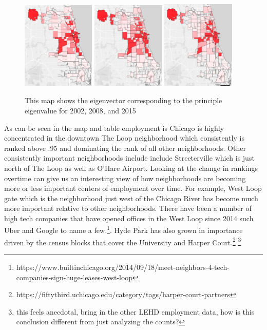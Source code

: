 \documentclass{article}
\theoremstyle{definition}
\theoremstyle{remark}
\begin{document}
\begin{figure}[H]
    \centering
    \includegraphics[width=0.31\textwidth]{Jobs-S000-2002}
    \includegraphics[width=0.31\textwidth]{Jobs-S000-2008}
    \includegraphics[width=0.31\textwidth]{Jobs-S000-2015}

        
    \caption{This map shows the eigenvector corresponding to the principle eigenvalue for 2002, 2008, and 2015}
    \label{fig:Jobs-S000-2008}
\end{figure}

As can be seen in the map and table employment is Chicago is highly concentrated in the downtown The Loop neighborhood which consistently is ranked above .95 and dominating the rank of all other neighborhoods.  Other consistently important neighborhoods include include Streeterville which is just north of The Loop as well as O'Hare Airport. Looking at the change in rankings overtime can give us an interesting view of how neighborhoods are becoming more or less important centers of employment over time.  For example, West Loop gate which is the neighborhood just west of the Chicago River has become much more important relative to other neighborhoods.  There have been a number of high tech companies that have opened offices in the West Loop since 2014 such Uber and Google to name a few.\footnote{https://www.builtinchicago.org/2014/09/18/meet-neighbors-4-tech-companies-sign-huge-leases-west-loop}.  Hyde Park has also grown in importance driven by the census blocks that cover the University and Harper Court.\footnote{https://fiftythird.uchicago.edu/category/tags/harper-court-partners} \footnote{this feels anecdotal, bring in the other LEHD employment data, how is this conclusion different from just analyzing the counts?}\\
\end{document}
